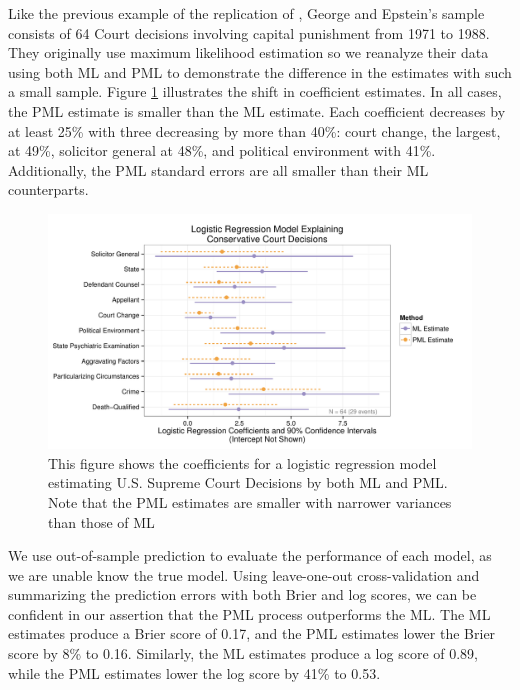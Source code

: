 \documentclass[12pt]{article}
\begin{document}
Like the previous example of the replication of \cite{Weisiger2014}, George and Epstein's sample consists of 64 Court decisions involving capital punishment from 1971 to 1988. 
They originally use maximum likelihood estimation so we reanalyze their data using both ML and PML to demonstrate the difference in the estimates with such a small sample. 
Figure \ref{fig:ge-coefs} illustrates the shift in coefficient estimates. 
In all cases, the PML estimate is smaller than the ML estimate. 
Each coefficient decreases by at least 25\% with three decreasing by more than 40\%: court change, the largest, at 49\%, solicitor general at 48\%, and political environment with 41\%. 
Additionally, the PML standard errors are all smaller than their ML counterparts. 

\begin{figure}[H]
\begin{center}
\includegraphics[width = \textwidth]{figs/ge-coefs.pdf}
\caption{This figure shows the coefficients for a logistic regression model estimating U.S. Supreme Court Decisions by both ML and PML. Note that the PML estimates are smaller with narrower variances than those of ML}\label{fig:ge-coefs}
\end{center}
\end{figure}

We use out-of-sample prediction to evaluate the performance of each model, as we are unable know the true model. 
Using leave-one-out cross-validation and summarizing the prediction errors with both Brier and log scores, we can be confident in our assertion that the PML process outperforms the ML. 
The ML estimates produce a Brier score of 0.17, and the PML estimates lower the Brier score by 8\% to 0.16. 
Similarly, the ML estimates produce a log score of 0.89, while the PML estimates lower the log score by 41\% to 0.53. 
\end{document}
